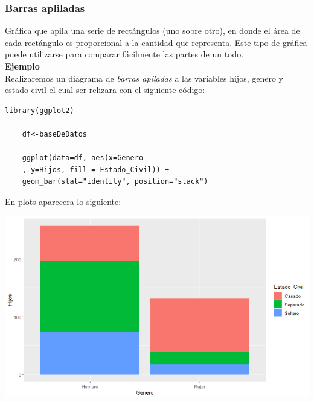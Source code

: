 \documentclass[12pt,hidelinks]{article}
\begin{document}
	\subsubsection{Barras apliladas}
	Gráfica que apila una serie de rectángulos (uno sobre otro), en donde el área de cada rectángulo es proporcional a la cantidad que representa. Este tipo de gráfica puede utilizarse para comparar fácilmente las partes de un todo.\\
	\textbf{Ejemplo}\\
	Realizaremos un diagrama de \textit{barras apiladas} a las variables hijos, genero y estado civil el cual ser relizara con el siguiente código:
	\begin{lstlisting}[frame=single]
	library(ggplot2)
	
	df<-baseDeDatos
	
	ggplot(data=df, aes(x=Genero
	, y=Hijos, fill = Estado_Civil)) + 
	geom_bar(stat="identity", position="stack")
	\end{lstlisting}
	En plots aparecera lo siguiente:
	\begin{center}
		\includegraphics[width = 14cm]{GraficaBarrasA.PNG}
	\end{center}
	
\end{document}
